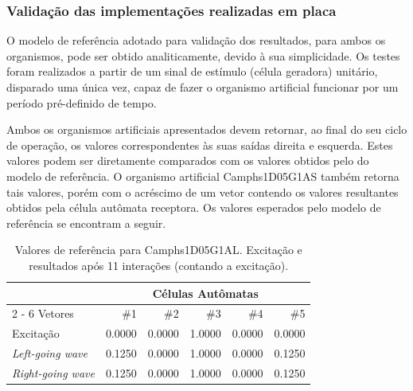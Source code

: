 \subsubsection{Validação das implementações realizadas em placa} 

O modelo de referência adotado para validação dos resultados, para ambos os organismos, pode ser obtido analiticamente, devido à sua simplicidade. Os testes foram realizados a partir de um sinal de estímulo (célula geradora) unitário, disparado uma única vez, capaz de fazer o organismo artificial funcionar por um período pré-definido de tempo.

Ambos os organismos artificiais apresentados devem retornar, ao final do seu ciclo de operação, os valores correspondentes às suas saídas direita e esquerda. Estes valores podem ser diretamente comparados com os valores obtidos pelo do modelo de referência. O organismo artificial Camphs1D05G1AS também retorna tais valores, porém com o acréscimo de um vetor contendo os valores resultantes obtidos pela célula autômata receptora. Os valores esperados pelo modelo de referência se encontram a seguir.

\begin{table}[h]
\caption{\label{tab:refaxilite} Valores de referência para Camphs1D05G1AL. Excitação e resultados após 11 interações (contando a excitação).}
\begin{center}
\begin{tabular}{| l | r | r | r | r | r |}
\hline
& \multicolumn{5}{c|}{Células Autômatas}\\
\cline{2 - 6} %
Vetores & \#1 & \#2 & \#3 & \#4 & \#5 \\
\hline
Excitação & 0{.}0000 & 0{.}0000 & 1{.}0000 & 0{.}0000 & 0{.}0000 \\
\textit{Left-going wave} & 0{.}1250 & 0{.}0000 & 1{.}0000 & 0{.}0000 & 0{.}1250 \\
\textit{Right-going wave} & 0{.}1250 & 0{.}0000 & 1{.}0000 & 0{.}0000 & 0{.}1250 \\
\hline
\end{tabular}
\end{center}
\end{table}

